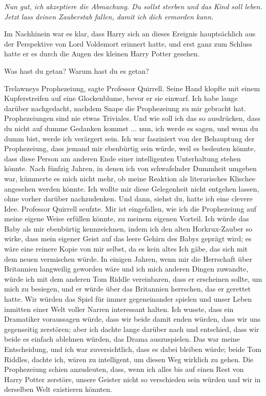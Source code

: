 \glqq{}\emph{Nun gut, ich akzeptiere die Abmachung. Du sollst sterben und das
Kind soll leben. Jetzt lass deinen Zauberstab fallen, damit ich dich ermorden
kann.}\grqq{}

Im Nachhinein war es klar, dass Harry sich an dieses Ereignis hauptsächlich aus
der Perspektive von Lord Voldemort erinnert hatte, und erst ganz zum Schluss
hatte er es durch die Augen des kleinen Harry Potter gesehen.

\glqq{}Was hast du getan? Warum hast du es getan?\grqq{}

\glqq{}Trelawneys Prophezeiung\grqq{}, sagte Professor Quirrell. Seine Hand
klopfte mit einem Kupferstreifen auf eine Glockenblume, bevor er sie einwarf.
\glqq{}Ich habe lange darüber nachgedacht, nachdem Snape die Prophezeiung zu mir
gebracht hat. Prophezeiungen sind nie etwas Triviales. Und wie soll ich das so
ausdrücken, dass du nicht auf dumme Gedanken kommst ... nun, ich werde es sagen,
und wenn du dumm bist, werde ich verärgert sein. Ich war fasziniert von der
Behauptung der Prophezeiung, dass jemand mir ebenbürtig sein würde, weil es
bedeuten könnte, dass diese Person am anderen Ende einer intelligenten
Unterhaltung stehen könnte. Nach fünfzig Jahren, in denen ich von schwafelnder
Dummheit umgeben war, kümmerte es mich nicht mehr, ob meine Reaktion als
literarisches Klischee angesehen werden könnte. Ich wollte mir diese Gelegenheit
nicht entgehen lassen, ohne vorher darüber nachzudenken. Und dann, siehst du,
hatte ich eine clevere Idee.\grqq{} Professor Quirrell seufzte. \glqq{}Mir ist
eingefallen, wie ich die Prophezeiung auf meine eigene Weise erfüllen könnte, zu
meinem eigenen Vorteil. Ich würde das Baby als mir ebenbürtig kennzeichnen,
indem ich den alten Horkrux-Zauber so wirke, dass mein eigener Geist auf das
leere Gehirn des Babys geprägt wird; es wäre eine reinere Kopie von mir selbst,
da es kein altes Ich gäbe, das sich mit dem neuen vermischen würde. In einigen
Jahren, wenn mir die Herrschaft über Britannien langweilig geworden wäre und ich
mich anderen Dingen zuwandte, würde ich mit dem anderen Tom Riddle vereinbaren,
dass er erscheinen sollte, um mich zu besiegen, und er würde über das Britannien
herrschen, das er gerettet hatte. Wir würden das Spiel für immer gegeneinander
spielen und unser Leben inmitten einer Welt voller Narren interessant halten.
Ich wusste, dass ein Dramatiker voraussagen würde, dass wir beide damit enden
würden, dass wir uns gegenseitig zerstören; aber ich dachte lange darüber nach
und entschied, dass wir beide es einfach ablehnen würden, das Drama
auszuspielen. Das war meine Entscheidung, und ich war zuversichtlich, dass es
dabei bleiben würde; beide Tom Riddles, dachte ich, wären zu intelligent, um
diesen Weg wirklich zu gehen. Die Prophezeiung schien anzudeuten, dass, wenn ich
alles bis auf einen Rest von Harry Potter zerstöre, unsere Geister nicht so
verschieden sein würden und wir in derselben Welt existieren könnten.\grqq{}

